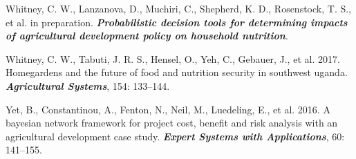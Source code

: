 \documentclass[
]{article}
\newlength{\cslhangindent}
\newlength{\cslentryspacingunit} %
\newenvironment{CSLReferences}[2] %
 {%
  \setlength{\parindent}{0pt}
  \ifodd #1
  \let\oldpar\par
  \def\par{\hangindent=\cslhangindent\oldpar}
  \fi
  \setlength{\parskip}{#2\cslentryspacingunit}
 }%
 {}
\begin{document}
\begin{CSLReferences}{1}{0}
\leavevmode{}%
Whitney, C. W., Lanzanova, D., Muchiri, C., Shepherd, K. D., Rosenstock,
T. S., et al. in preparation. \textbf{\emph{Probabilistic decision tools
for determining impacts of agricultural development policy on household
nutrition}}.

\leavevmode{}%
Whitney, C. W., Tabuti, J. R. S., Hensel, O., Yeh, C., Gebauer, J., et
al. 2017. Homegardens and the future of food and nutrition security in
southwest uganda. \textbf{\emph{Agricultural Systems}}, 154: 133--144.

\leavevmode{}%
Yet, B., Constantinou, A., Fenton, N., Neil, M., Luedeling, E., et al.
2016. A bayesian network framework for project cost, benefit and risk
analysis with an agricultural development case study.
\textbf{\emph{Expert Systems with Applications}}, 60: 141--155.

\end{CSLReferences}
\end{document}
